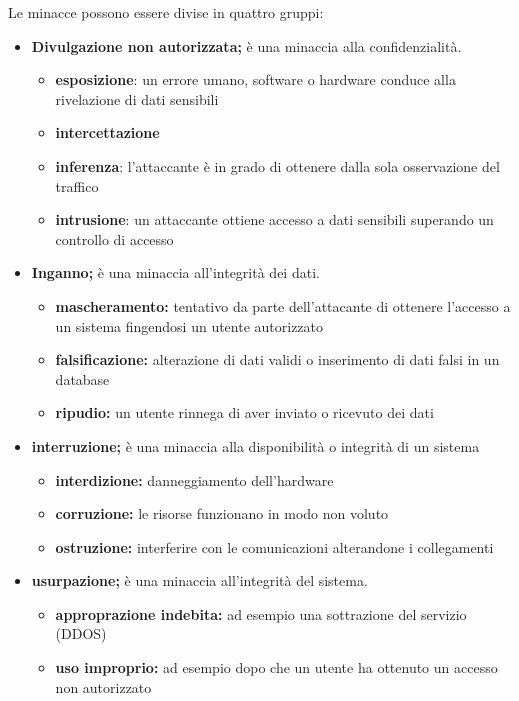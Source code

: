 Le minacce possono essere divise in quattro gruppi:
\begin{itemize}
    \item \textbf{Divulgazione non autorizzata;} è una minaccia alla confidenzialità.
    \begin{itemize}
        \item \textbf{esposizione}: un errore umano, software o hardware conduce alla rivelazione di dati sensibili
        \item \textbf{intercettazione}
        \item \textbf{inferenza}: l'attaccante è in grado di ottenere dalla sola osservazione del traffico
        \item \textbf{intrusione}: un attaccante ottiene accesso a dati sensibili superando un controllo di accesso
    \end{itemize}
    \item \textbf{Inganno;} è una minaccia all'integrità dei dati.
    \begin{itemize}
        \item \textbf{mascheramento:} tentativo da parte dell'attacante di ottenere l'accesso a un sistema fingendosi un utente autorizzato
        \item \textbf{falsificazione:} alterazione di dati validi o inserimento di dati falsi in un database
        \item \textbf{ripudio:} un utente rinnega di aver inviato o ricevuto dei dati
    \end{itemize}
    \item \textbf{interruzione;} è una minaccia alla disponibilità o integrità di un sistema
    \begin{itemize}
        \item \textbf{interdizione:} danneggiamento dell'hardware
        \item \textbf{corruzione:} le risorse funzionano in modo non voluto
        \item \textbf{ostruzione:} interferire con le comunicazioni alterandone i collegamenti
    \end{itemize}
    \item \textbf{usurpazione;} è una minaccia all'integrità del sistema.
    \begin{itemize}
        \item \textbf{approprazione indebita:} ad esempio una sottrazione del servizio (DDOS)
        \item \textbf{uso improprio:} ad esempio dopo che un utente ha ottenuto un accesso non autorizzato  
    \end{itemize}
\end{itemize}

